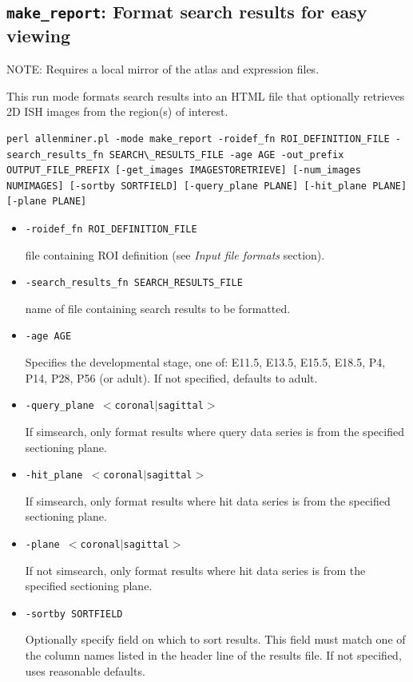 \documentclass[10pt]{article}
\begin{document}
\subsection{{\tt make\_report}: Format search results for easy viewing}
NOTE: Requires a local mirror of the atlas and expression files.

This run mode formats search results into an HTML file that optionally retrieves 2D ISH images from the region(s) of interest.

\begin{lstlisting}
perl allenminer.pl -mode make_report -roidef_fn ROI_DEFINITION_FILE -search_results_fn SEARCH\_RESULTS_FILE -age AGE -out_prefix OUTPUT_FILE_PREFIX [-get_images IMAGESTORETRIEVE] [-num_images NUMIMAGES] [-sortby SORTFIELD] [-query_plane PLANE] [-hit_plane PLANE] [-plane PLANE]
\end{lstlisting}

\begin{itemize}
\item {\tt -roidef\_fn ROI\_DEFINITION\_FILE}

file containing ROI definition (see {\it Input file formats} section).

\item {\tt -search\_results\_fn SEARCH\_RESULTS\_FILE}

name of file containing search results to be formatted.

\item {\tt -age AGE}

Specifies the developmental stage, one of: E11.5, E13.5, E15.5, E18.5, P4, P14, P28, P56 (or adult). If not specified, defaults to adult.

\item {\tt -query\_plane $<$coronal$|$sagittal$>$}

If simsearch, only format results where query data series is from the specified sectioning plane.

\item {\tt -hit\_plane $<$coronal$|$sagittal$>$}

If simsearch, only format results where hit data series is from the specified sectioning plane.

\item {\tt -plane $<$coronal$|$sagittal$>$}

If not simsearch, only format results where hit data series is from the specified sectioning plane.

\item {\tt -sortby SORTFIELD}

Optionally specify field on which to sort results. This field must match one of the column names listed in the header line of the results file. If not specified, uses reasonable defaults.

\end{itemize}
\end{document}
